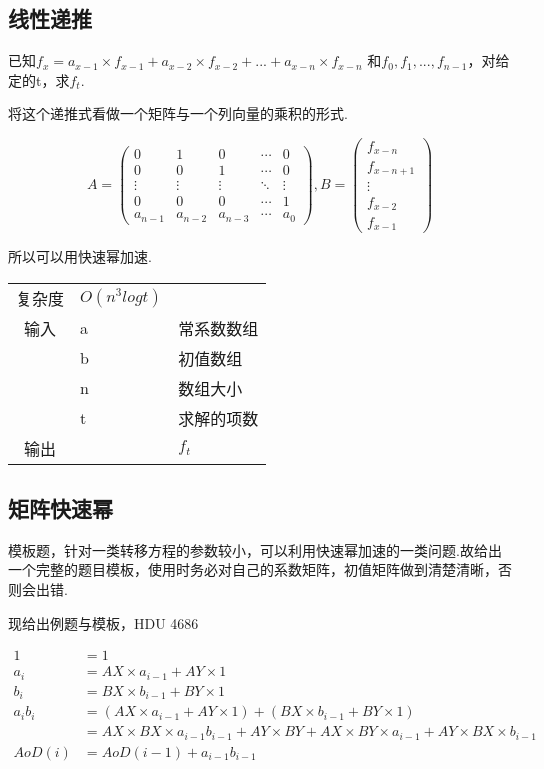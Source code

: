     \subsection{线性递推}\small
已知$f_x = a_{x-1} \times f_{x-1} + a_{x-2} \times f_{x-2} + ... + a_{x-n} \times f_{x-n}$
和$f_0, f_1, ..., f_{n-1}$，对给定的t，求$f_t$.

将这个递推式看做一个矩阵与一个列向量的乘积的形式.

\[A = \left( {\begin{array}{*{20}{c}}
0&1&0& \cdots &0\\
0&0&1& \cdots &0\\
 \vdots & \vdots & \vdots & \ddots & \vdots \\
0&0&0& \cdots &1\\
{{a_{n - 1}}}&{{a_{n - 2}}}&{{a_{n - 3}}}& \cdots &{{a_0}}
\end{array}} \right),B = \left( {\begin{array}{*{20}{c}}
{{f_{x - n}}}\\
{{f_{x - n + 1}}}\\
 \vdots \\
{{f_{x - 2}}}\\
{{f_{x - 1}}}
\end{array}} \right)\]

所以可以用快速幂加速.
\begin{longtable}{|c|l|l|}
复杂度 & $O(n^{3}logt)$ & \\
输入 & a & 常系数数组 \\
 & b & 初值数组 \\
 & n & 数组大小 \\
 & t & 求解的项数 \\
输出 &  & $f_t$ \\
\end{longtable}



    \subsection{矩阵快速幂}\small
模板题，针对一类转移方程的参数较小，可以利用快速幂加速的一类问题.故给出
一个完整的题目模板，使用时务必对自己的系数矩阵，初值矩阵做到清楚清晰，否
则会出错.

现给出例题与模板，HDU 4686

$
\begin{aligned}
 1 &= 1\\
 {a_i} &= AX \times {a_{i - 1}} + AY \times 1\\
 {b_i} &= BX \times {b_{i - 1}} + BY \times 1\\
 {a_i}{b_i} &= (AX \times {a_{i - 1}} + AY \times 1) + (BX \times {b_{i - 1}} + BY \times 1)\\
 &= AX \times BX \times {a_{i - 1}}{b_{i - 1}} + AY \times BY + AX \times BY \times {a_{i - 1}} + AY \times BX \times {b_{i - 1}}\\
 AoD(i) &= AoD(i - 1) + {a_{i - 1}}{b_{i - 1}}
\end{aligned}
$

